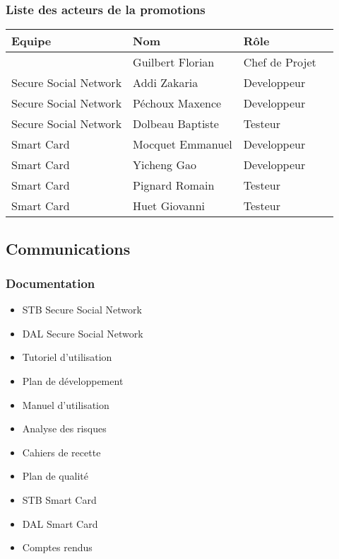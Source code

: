 \documentclass[a4paper,11pt,french]{article}
\begin{document}
\subsubsection{Liste des acteurs de la promotions}
\begin{center}
	\begin{tabularx}{16cm}{|X|X|X|X|}
	\hline
	\bfseries{Equipe} & \bfseries{Nom} & \bfseries{Rôle}\\
	\hline
		& Guilbert Florian & Chef de Projet\\
	\hline
	Secure Social Network & Addi Zakaria & Developpeur\\
	\hline
	Secure Social Network & Péchoux Maxence & Developpeur\\
	\hline
	Secure Social Network & Dolbeau Baptiste & Testeur\\
	\hline
	Smart Card & Mocquet Emmanuel & Developpeur\\
	\hline
	Smart Card & Yicheng Gao & Developpeur\\
	\hline
	Smart Card & Pignard Romain & Testeur\\
	\hline
	Smart Card & Huet Giovanni & Testeur\\
	\hline
	\end{tabularx}
\end{center}
\vspace*{0cm}

\subsection{Communications}
\subsubsection{Documentation}
\begin{itemize}
	\item STB Secure Social Network
	\item DAL Secure Social Network
	\item Tutoriel d'utilisation
	\item Plan de d\'eveloppement
	\item Manuel d'utilisation
	\item Analyse des risques
	\item Cahiers de recette
	\item Plan de qualité
	\item STB Smart Card
	\item DAL Smart Card
	\item Comptes rendus
\end{itemize}
\end{document}
